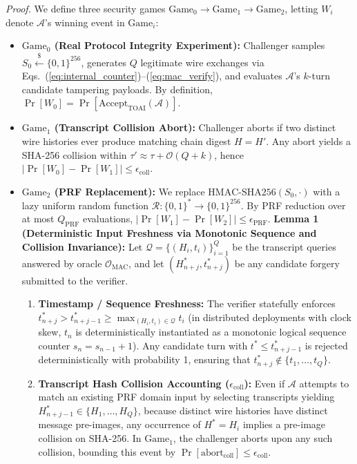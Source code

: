 \documentclass[9pt,a4paper]{extarticle}
\begin{document}
\emph{Proof.} We define three security games $\text{Game}_0 \rightarrow \text{Game}_1 \rightarrow \text{Game}_2$, letting $W_i$ denote $\mathcal{A}$'s winning event in $\text{Game}_i$:
\begin{itemize}
  \item \textbf{$\text{Game}_0$ (Real Protocol Integrity Experiment):} Challenger samples $S_0 \stackrel{\$}{\leftarrow} \{0,1\}^{256}$, generates $Q$ legitimate wire exchanges via Eqs.\ (\ref{eq:internal_counter})--(\ref{eq:mac_verify}), and evaluates $\mathcal{A}$'s $k$-turn candidate tampering payloads. By definition, $\Pr[W_0] = \Pr[\text{Accept}_{\text{TOAI}}(\mathcal{A})]$.
  \item \textbf{$\text{Game}_1$ (Transcript Collision Abort):} Challenger aborts if two distinct wire histories ever produce matching chain digest $H = H'$. Any abort yields a SHA-256 collision within $\tau' \approx \tau + \mathcal{O}(Q+k)$, hence $|\Pr[W_0] - \Pr[W_1]| \le \epsilon_{\text{coll}}$.
  \item \textbf{$\text{Game}_2$ (PRF Replacement):} We replace $\text{HMAC-SHA256}(S_0, \cdot)$ with a lazy uniform random function $\mathcal{R}: \{0,1\}^* \rightarrow \{0,1\}^{256}$. By PRF reduction over at most $Q_{\text{PRF}}$ evaluations, $|\Pr[W_1] - \Pr[W_2]| \le \epsilon_{\text{PRF}}$. \textbf{Lemma 1 (Deterministic Input Freshness via Monotonic Sequence and Collision Invariance):} Let $\mathcal{Q} = \{(H_i, t_i)\}_{i=1}^Q$ be the transcript queries answered by oracle $\mathcal{O}_{\text{MAC}}$, and let $(H_{n+j}^*, t_{n+j}^*)$ be any candidate forgery submitted to the verifier.
\begin{enumerate}[leftmargin=1.4em,itemsep=1pt,topsep=1pt]
  \item \textbf{Timestamp / Sequence Freshness:} The verifier statefully enforces $t_{n+j}^* > t_{n+j-1}^* \ge \max_{(H_i, t_i) \in \mathcal{Q}} t_i$ (in distributed deployments with clock skew, $t_n$ is deterministically instantiated as a monotonic logical sequence counter $s_n = s_{n-1} + 1$). Any candidate turn with $t^* \le t_{n+j-1}^*$ is rejected deterministically with probability 1, ensuring that $t_{n+j}^* \notin \{t_1, \dots, t_Q\}$.
  \item \textbf{Transcript Hash Collision Accounting ($\epsilon_{\text{coll}}$):} Even if $\mathcal{A}$ attempts to match an existing PRF domain input by selecting transcripts yielding $H_{n+j-1}^* \in \{H_1, \dots, H_Q\}$, because distinct wire histories have distinct message pre-images, any occurrence of $H^* = H_i$ implies a pre-image collision on SHA-256. In $\text{Game}_1$, the challenger aborts upon any such collision, bounding this event by $\Pr[\text{abort}_{\text{coll}}] \le \epsilon_{\text{coll}}$.

\end{enumerate}
\end{itemize}
\end{document}
